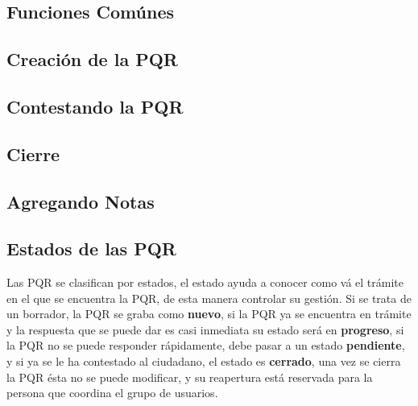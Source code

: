 \subsection{Funciones Comúnes}


\subsection {Creación de la PQR}

\subsection {Contestando la PQR}

\subsection {Cierre}

\subsection {Agregando Notas}



\subsection{Estados de las PQR}

Las PQR se clasifican por estados, el estado ayuda a conocer como vá el trámite en el que se encuentra la PQR, de esta manera controlar su gestión.
Si se trata de un borrador, la PQR se graba como \textbf{nuevo}, si la PQR ya se encuentra en trámite y la respuesta que se puede dar es casi inmediata
su estado será en \textbf{progreso}, si la PQR no se puede responder rápidamente, debe pasar a un estado \textbf{pendiente}, y si ya se le ha contestado al ciudadano, 
el estado es \textbf{cerrado}, una vez se cierra la PQR ésta no se puede modificar, y su reapertura está reservada para la persona que coordina el 
grupo de usuarios.

